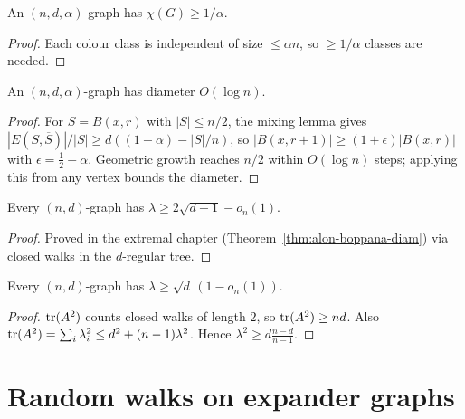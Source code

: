 \begin{corollary}
  \label{cor:chromatic}
  An $(n,d,\alpha)$-graph has $\chi(G)\ge1/\alpha$.
\end{corollary}
\begin{proof}
  Each colour class is independent of size $\le\alpha n$, so $\ge1/\alpha$
  classes are needed.
\end{proof}

\begin{theorem}
  \label{thm:diameter}
  An $(n,d,\alpha)$-graph has diameter $O(\log n)$.
\end{theorem}
\begin{proof}
  For $S=B(x,r)$ with $|S|\le n/2$, the mixing lemma gives
  $|E(S,\overline S)|/|S|\ge d((1-\alpha)-|S|/n)$, so
  $|B(x,r+1)|\ge(1+\epsilon)|B(x,r)|$ with $\epsilon=\tfrac12-\alpha$. Geometric
  growth reaches $n/2$ within $O(\log n)$ steps; applying this from any vertex
  bounds the diameter.
\end{proof}

\begin{theorem}
  \label{thm:alon-boppana}
  Every $(n,d)$-graph has $\lambda\ge2\sqrt{d-1}-o_n(1)$.
\end{theorem}
\begin{proof}
  Proved in the extremal chapter (Theorem~\ref{thm:alon-boppana-diam}) via
  closed walks in the $d$-regular tree.
\end{proof}

\begin{claim}
  \label{claim:weak-alon-boppana}
  Every $(n,d)$-graph has $\lambda\ge\sqrt d\,(1-o_n(1))$.
\end{claim}
\begin{proof}
  $\operatorname{tr}(A^2)$ counts closed walks of length $2$, so $\operatorname{tr}(A^2)\ge nd$. Also
  $\operatorname{tr}(A^2)=\sum_i\lambda_i^2\le d^2+(n-1)\lambda^2$. Hence
  $\lambda^2\ge d\tfrac{n-d}{n-1}$.
\end{proof}


\chapter{Random walks on expander graphs}

